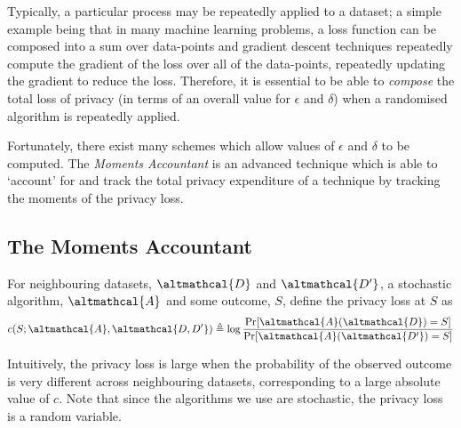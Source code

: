 Typically, a particular process may be repeatedly applied to a dataset; a simple example being that in many machine learning problems, a loss function can be composed into a sum over data-points and gradient descent techniques repeatedly compute the gradient of the loss over all of the data-points, repeatedly updating the gradient to reduce the loss. \cite{ruder2016overview} Therefore, it is essential to be able to \emph{compose} the total loss of privacy (in terms of an overall value for $\epsilon$ and $\delta$) when a randomised algorithm is repeatedly applied. 

Fortunately, there exist many schemes which allow values of $\epsilon$ and $\delta$ to be computed. The \emph{Moments Accountant} is an advanced technique which is able to `account' for and track the total privacy expenditure of a technique by tracking the moments of the privacy loss. 

\subsection{The Moments Accountant}
\begin{definition} For neighbouring datasets, $\altmathcal{D}$ and $\altmathcal{D'}$, a stochastic algorithm, $\altmathcal{A}$ and some outcome, $S$, define the privacy loss at $S$ as
	\begin{equation}
	c(S; \altmathcal{A}, \altmathcal{D, D'}) \triangleq \log \frac{\Pr[ \altmathcal{A}( \altmathcal{D})=S]}{\Pr[ \altmathcal{A}(\altmathcal{D'}) = S]}
	\end{equation}
\end{definition}
Intuitively, the privacy loss is large when the probability of the observed outcome is very different across neighbouring datasets, corresponding to a large absolute value of $c$. Note that since the algorithms we use are stochastic, the privacy loss is a random variable. \cite{moments_account}

